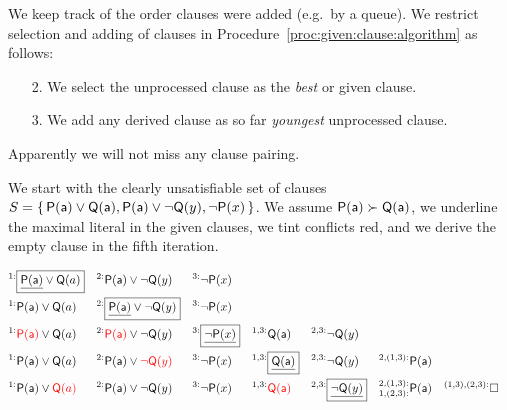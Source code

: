\begin{definition}
	We keep track of the order clauses were added (e.g.\ by a queue).
	We restrict selection and adding of clauses
	in Procedure~\ref{proc:given:clause:algorithm} as follows:
	\begin{enumerate}
		\item[2.]
		We select the  unprocessed clause as the \emph{best} or given clause.
		\item[3.]
		We add any derived clause
		as so far \emph{youngest} unprocessed clause.
	\end{enumerate}
	Apparently we will not miss any clause pairing.
\end{definition}



\begin{example}
	We start with the clearly unsatisfiable set of clauses
\( S=\{ \, \mathsf{P}(\mathsf{a})\lor\mathsf{Q}(\mathsf{a}), \mathsf{P}(\mathsf{a})\lor\lnot\mathsf{Q}(y), \lnot\mathsf{P}(x) \, \} \).
	We assume \( \mathsf{P}(\mathsf{a})\succ\mathsf{Q}(\mathsf{a}) \),
	we underline the maximal literal in the given clauses,
	we tint conflicts red,
	 and we derive the empty clause in the fifth iteration.

	\begin{align*}
	^{1:}&\boxed{\underline{\mP(\ma)}\lor\mQ(a)}
	& ^{2:}&\mP(\ma)\lor\lnot\mQ(y) & ^{3:}&\lnot\mP(x)
	\\
	^{1:}&\mP(\ma)\lor\mQ(a)
	& ^{2:}&\boxed{\underline{\mP(\ma)}\lor\lnot\mQ(y)} & ^{3:}&\lnot\mP(x)
	\\
	^{1:}&{\colLo\mP(\ma)}\lor\mQ(a)
	& ^{2:}&{\colLo\mP(\ma)}\lor\lnot\mQ(y)
	& ^{3:}&\boxed{\underline{\lnot\mP(x)}}
	& ^{1,3:}&\mQ(\ma)
	& ^{2,3:}&\lnot\mQ(y)
	\\
	^{1:}&\mP(\ma)\lor\mQ(a)
	& ^{2:}&\mP(\ma)\lor{\colLo\lnot\mQ(y)}
	& ^{3:}&\lnot\mP(x)
	& ^{1,3:}&\boxed{\underline{\mQ(\ma)}}
	& ^{2,3:}&\lnot\mQ(y)
	& ^{2,(1,3):}&\mP(\ma)
	\\
	^{1:}&\mP(\ma)\lor{\colLo\mQ(a)}
	& ^{2:}&\mP(\ma)\lor\lnot\mQ(y)
	& ^{3:}&\lnot\mP(x)
	& ^{1,3:}&\colLo\mQ(\ma)
	& ^{2,3:}&\boxed{\underline{\lnot\mQ(y)}}
	& ^{2,(1,3):}_{1,(2,3):}&\mP(\ma)
	& ^{(1,3),(2,3):}&\emptyclause
	\\
	\end{align*}
\end{example}


